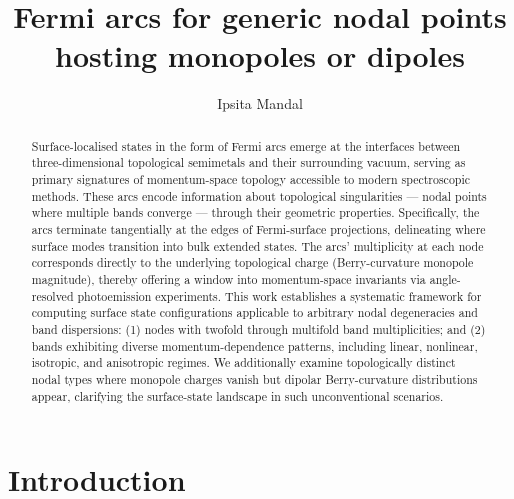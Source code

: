 \documentclass[aps,prb,onecolumn, footinbib, 10pt]{revtex4-2}
\begin{document}
\title{Fermi arcs for generic nodal points hosting monopoles or dipoles}


\author{Ipsita Mandal}



\begin{abstract}
Surface-localised states in the form of Fermi arcs emerge at the interfaces between three-dimensional topological semimetals and their surrounding vacuum, serving as primary signatures of momentum-space topology accessible to modern spectroscopic methods. These arcs encode information about topological singularities --- nodal points where multiple bands converge --- through their geometric properties. Specifically, the arcs terminate tangentially at the edges of Fermi-surface projections, delineating where surface modes transition into bulk extended states. The arcs' multiplicity at each node corresponds directly to the underlying topological charge (Berry-curvature monopole magnitude), thereby offering a window into momentum-space invariants via angle-resolved photoemission experiments. This work establishes a systematic framework for computing surface state configurations applicable to arbitrary nodal degeneracies and band dispersions: (1) nodes with twofold through multifold band multiplicities; and (2) bands exhibiting diverse momentum-dependence patterns, including linear, nonlinear, isotropic, and anisotropic regimes. We additionally examine topologically distinct nodal types where monopole charges vanish but dipolar Berry-curvature distributions appear, clarifying the surface-state landscape in such unconventional scenarios.
\end{abstract}

\maketitle



\section{Introduction}
\end{document}
